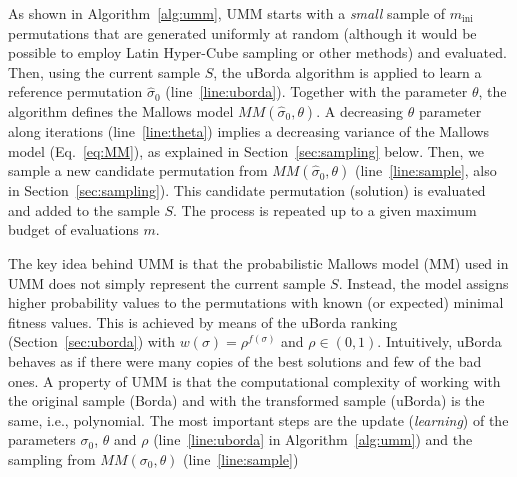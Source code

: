 \documentclass[sigconf,dvipsnames]{acmart}
\newcommand{\minit}{\ensuremath{m_\text{ini}}\xspace}
\newcommand{\FEmax}{\ensuremath{m}}
\begin{document}
As shown in Algorithm~\ref{alg:umm}, UMM  starts with a \emph{small} sample of $\minit$ permutations that are generated uniformly at random  (although it would be possible to employ Latin Hyper-Cube sampling or other methods) and evaluated. Then, using the current sample $S$, the uBorda algorithm is applied to learn a reference permutation $\hat{\sigma}_0$ (line~\ref{line:uborda}). 
Together with the parameter $\theta$, the algorithm defines the Mallows model $MM(\hat\sigma_0, \theta)$. 
A decreasing $\theta$ parameter along iterations (line~\ref{line:theta}) implies a decreasing variance of the Mallows model (Eq.~\ref{eq:MM}), as explained in  Section~\ref{sec:sampling} below. 
Then, we sample a new candidate permutation from  $MM(\hat\sigma_0, \theta)$ (line~\ref{line:sample}, also  in  Section~\ref{sec:sampling}). This candidate permutation (solution) is evaluated and added to the sample $S$. The process is repeated up to a given maximum budget of evaluations $\FEmax$.

The key idea behind UMM is that the probabilistic Mallows model (MM) used in
UMM does not simply represent the current sample $S$. Instead, the model
assigns higher probability values to the permutations with known (or expected)
minimal fitness values. This is achieved by means of the uBorda ranking
(Section~\ref{sec:uborda}) with $w(\sigma) = \rho^{f(\sigma)}$ and $\rho \in (0,1)$. %
Intuitively, uBorda behaves as if there were many copies of the best
solutions and few of the bad ones. A property of UMM is that the
computational complexity of working with the original sample (Borda) and with the
transformed sample (uBorda) is the same, i.e., polynomial. The most important steps are the update
(\emph{learning}) of the parameters $\sigma_0$, $\theta$ and $\rho$ (line~\ref{line:uborda} in Algorithm~\ref{alg:umm}) and
the sampling from $MM(\sigma_0,\theta)$ (line~\ref{line:sample}) %
\end{document}
